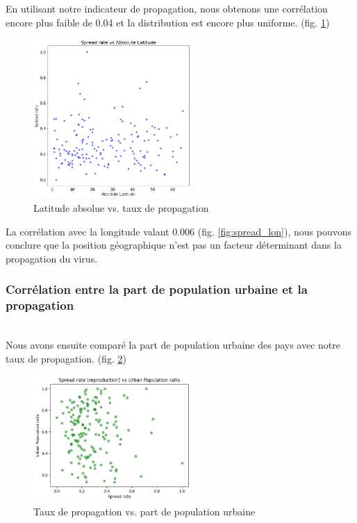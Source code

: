 \documentclass[12pt]{iEEEtran}
\begin{document}
En utilisant notre indicateur de propagation, nous obtenons une corrélation encore
plus faible de 0.04 et la distribution est encore plus uniforme. (fig. \ref{fig:spread_lat})

\begin{figure}[h]
    \centering
    \includegraphics[width=6cm]{img/spread_lat.png}
    \caption{Latitude absolue vs. taux de propagation}
    \label{fig:spread_lat}
\end{figure}

La corrélation avec la longitude valant 0.006 (fig. \ref{fig:spread_lon}), nous pouvons conclure que la position
géographique n'est pas un facteur déterminant dans la propagation du virus.

\newpage

\subsubsection{Corrélation entre la part de population urbaine et la propagation}\hfill\\

Nous avons ensuite comparé la part de population urbaine des pays avec notre taux de propagation. (fig. \ref{fig:spread_urb_rate})

\begin{figure}[h]
    \centering
    \includegraphics[width=6cm]{img/spread_urb_rate.png}
    \caption{Taux de propagation vs. part de population urbaine}
    \label{fig:spread_urb_rate}
\end{figure}
\end{document}
